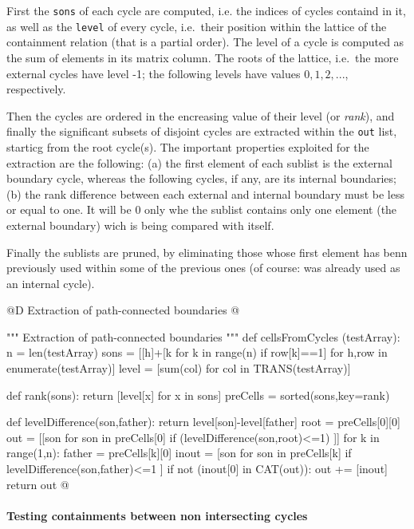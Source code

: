 \documentclass[11pt,oneside]{article}    %
\begin{document}
First the \texttt{sons} of each cycle are computed, i.e. the indices of cycles containd in it, as well as the \texttt{level} of every cycle, i.e.~their position within the lattice of the containment relation (that is a partial order). 
The level of a cycle is computed as the sum of elements in its matrix column. The roots of the lattice, i.e.~the more external cycles have level -1; the following levels have values $0,1,2,...$, respectively.

Then the cycles are ordered in the encreasing value of their level (or \emph{rank}), and finally the significant subsets of disjoint cycles are extracted within the \texttt{out} list, starticg from the root cycle(s). The important properties exploited for the extraction are the following: (a) the first element of each sublist is the external boundary cycle, whereas the following cycles, if any, are its internal boundaries; (b) the rank difference between each external and internal boundary must be less or equal to one. It will be 0 only whe the sublist contains only one element (the external boundary) wich is being compared with itself.

Finally the sublists are pruned, by eliminating those whose first element has benn previously used within some of the previous ones (of course: was already used as an internal cycle).

@D Extraction of path-connected boundaries
@{""" Extraction of path-connected boundaries """
def cellsFromCycles (testArray):
    n = len(testArray)
    sons = [[h]+[k for k in range(n) if row[k]==1] for h,row in enumerate(testArray)]
    level = [sum(col) for col in TRANS(testArray)]
    
    def rank(sons): return [level[x] for x in sons]
    preCells = sorted(sons,key=rank)

    def levelDifference(son,father): return level[son]-level[father]
    root = preCells[0][0]
    out = [[son for son in preCells[0] if (levelDifference(son,root)<=1) ]]
    for k in range(1,n):
        father = preCells[k][0]
        inout = [son for son in preCells[k] if levelDifference(son,father)<=1 ]
        if not (inout[0] in CAT(out)):
            out += [inout]
    return out        
@}

\paragraph{Testing containments between non intersecting cycles}
\end{document}
